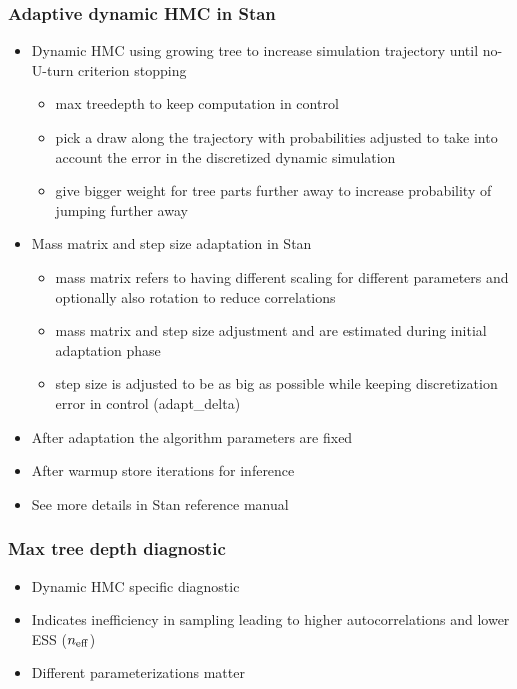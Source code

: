 \documentclass[10pt,handout]{beamer}
\begin{document}
\begin{frame}

\frametitle{Adaptive dynamic HMC in Stan}

  \begin{itemize}
  \item Dynamic HMC using growing tree to increase simulation
    trajectory until no-U-turn criterion stopping
    \begin{itemize}
    \item max treedepth to keep computation in control
    \item<2-> pick a draw along the trajectory with probabilities adjusted
      to take into account the error in the discretized dynamic
      simulation
    \item<3-> give bigger weight for tree parts further away to increase
      probability of jumping further away
    \end{itemize}
  \item<4-> Mass matrix and step size adaptation in Stan
    \begin{itemize}
    \item<4-> mass matrix refers to having different scaling for different
      parameters and optionally also rotation to reduce correlations
    \item<5-> mass matrix and step size adjustment and are estimated
      during initial adaptation phase
    \item<6-> step size is adjusted to be as big as possible while keeping
      discretization error in control (adapt\_delta)
    \end{itemize}
  \item<7-> After adaptation the algorithm parameters are fixed
  \item<8-> After warmup store iterations for inference
  \item<9-> See more details in Stan reference manual
\end{itemize}

\end{frame}

\begin{frame}

\frametitle{Max tree depth diagnostic}

  \begin{itemize}
  \item Dynamic HMC specific diagnostic
  \item Indicates inefficiency in sampling leading to higher
    autocorrelations and lower ESS ($n_{\rm eff}$)
  \item Different parameterizations matter
  \end{itemize}
\end{frame}
\end{document}
